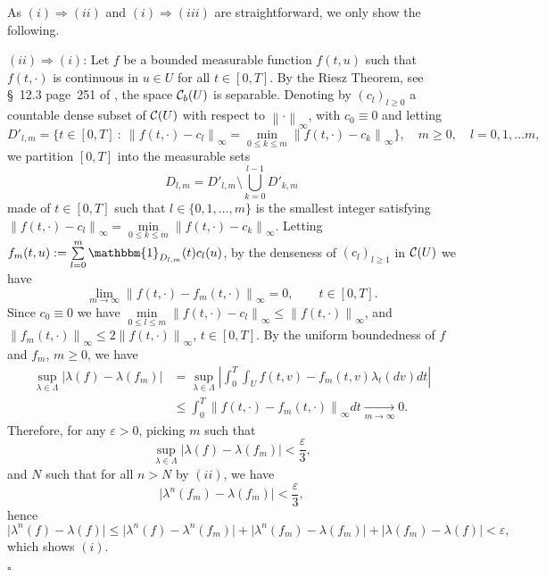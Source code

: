\documentclass[12pt]{article}
\theoremstyle{named}
\numberwithin{equation}{section}
\newcommand{\abs}[1]{\lvert#1\rvert}
\newcommand{\norm}[1]{\left\lVert#1\right\rVert}
\newenvironment{Proof}{\removelastskip\par\medskip \noindent{\em Proof.} \rm}{\penalty-20\null\hfill$\square$\par\medbreak}
\let\oldcitet=\citet
\renewcommand{\cite}[1]{\textcolor[rgb]{0,0,1}{\oldcitet{#1}}}
\renewcommand{\citet}[1]{\textcolor[rgb]{0,0,1}{\oldcitet{#1}}}
\begin{document}
\begin{Proof}
  As $(i) \Rightarrow (ii)$ and $(i) \Rightarrow (iii)$ are straightforward,
  we only show the following.

\noindent $(ii) \Rightarrow (i)$:
Let $f$ be a bounded measurable function $f(t,u)$
 such that $f(t,\cdot )$ is continuous in $u\in U$
 for all $t\in [0,T]$.
 By the Riesz Theorem, see \S~12.3 page~251 of \cite{royden1988real},
  the space ${\cal C}_b(U)$ is separable.
Denoting by $(c_l)_{l \geq 0}$ a countable dense subset of
${\cal C}(U)$ with respect to $\norm{\cdot }_{\infty}$,
 with $c_0\equiv 0$ and
 letting
\[D'_{l,m}=\big\{t \in [0,T] \ : \ \norm{f(t, \cdot )-c_l}_\infty = \min\limits_{0 \leq k \leq m} \norm{f(t, \cdot )-c_k }_\infty\big\},
\quad m \geq 0, \quad l=0,1,\ldots m,
\]
 we partition $[0,T]$ into the measurable sets
 $$D_{l,m} = D'_{l,m} \setminus \bigcup\limits_{k=0}^{l-1}D'_{k,m}
 $$
 made of $t \in [0,T]$
such that $l \in \{ 0,1,\ldots , m \}$ is
 the smallest integer satisfying
 $\norm{f(t, \cdot )-c_l}_\infty = \min\limits_{0 \leq k \leq m} \norm{f(t, \cdot )-c_k}_\infty$.
 Letting $f_m(t,u) := \sum\limits_{l=0}^{m}\mathbbm{1}_{D_{l,m}}(t)c_l(u)$,
 by the denseness of $( c_l )_{l \geq 1}$ in ${\cal C}(U)$ we have
\[
\lim\limits_{m \to \infty}
\norm{f(t, \cdot )-f_m(t, \cdot )}_\infty
= 0,
\qquad
 t \in [0,T].
\]
 Since $c_0 \equiv 0$ we have
  $\min\limits_{0 \leq l \leq m} \norm{f(t, \cdot )-c_l }_\infty \leq \norm{f(t, \cdot )}_\infty$, and
 $\norm{f_m(t, \cdot )}_\infty \leq 2\norm{f(t, \cdot )}_\infty$,
 $t \in [0,T]$.
 By the uniform boundedness of $f$ and $f_m$, $m\geq 0$,
  we have
 \begin{align}
   \nonumber
  \sup\limits_{\lambda \in \Lambda}
  \abs{\lambda(f) - \lambda(f_m)} &= \sup\limits_{\lambda \in \Lambda}
  \left| \int_0^T \int_U f(t,v)-f_m(t,v) \lambda_t(dv) dt\right| \\
  &\leq \int_0^T \norm{f(t, \cdot )-f_m(t,\cdot )}_\infty dt
  \xrightarrow[m \to \infty]{} 0. \nonumber
\end{align}
 Therefore, for any $\varepsilon > 0$, picking $m$ such that
\[
\sup\limits_{\lambda \in \Lambda} \abs{\lambda(f) - \lambda(f_m)} < \frac{\varepsilon}{3},
\]
 and $N$ such that for all $n > N$ by $(ii)$, we have
\[
\big|\lambda^n(f_m) - \lambda(f_m)\big| < \frac{\varepsilon}{3},
\]
 hence
\begin{equation} \label{equivalence part 1}
\big|\lambda^n(f) - \lambda(f)\big| \leq \big|\lambda^n(f) - \lambda^n(f_m)\big| + \big|\lambda^n(f_m) - \lambda(f_m)\big| + \abs{\lambda(f_m) - \lambda(f)} < \varepsilon,
\end{equation}
which shows $(i)$.


\end{Proof}
\end{document}
